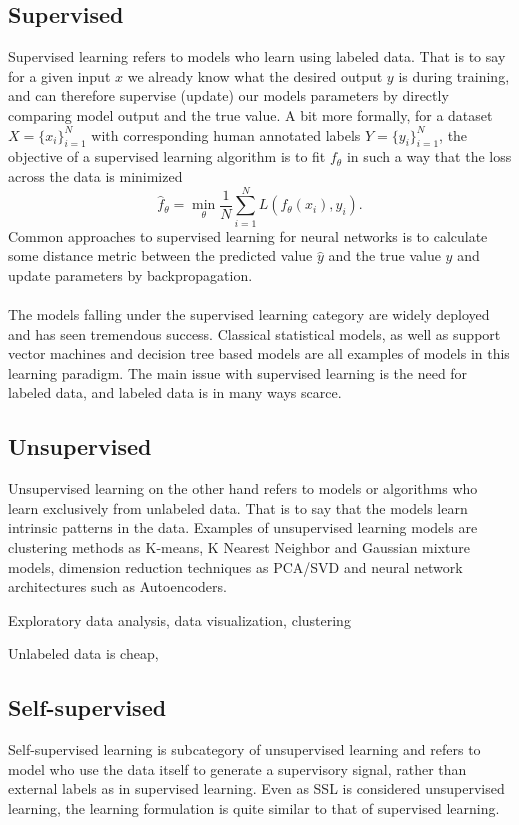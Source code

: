 \documentclass[../../thesis.tex]{subfiles}
\begin{document}
\subsection{Supervised}
Supervised learning refers to models who learn using labeled data. That is to say for a given input $x$ we already know what the desired output $y$ is during training, and can therefore supervise (update) our models parameters by directly comparing model output and the true value. A bit more formally, for a dataset $X = \{x_i\}_{i=1}^N$ with corresponding human annotated labels $Y = \{y_i\}_{i=1}^N$, the objective of a supervised learning algorithm is to fit $f_\theta$ in such a way that the loss across the data is minimized
\begin{equation}
    \widehat{f}_\theta = \min_\theta \frac{1}{N} \sum_{i=1}^N L(f_\theta(x_i),y_i).
\end{equation}
Common approaches to supervised learning for neural networks is to calculate some distance metric between the predicted value $\widehat{y}$ and the true value $y$ and update parameters by backpropagation.\\\\
The models falling under the supervised learning category are widely deployed and has seen tremendous success. Classical statistical models, as well as support vector machines and decision tree based models are all examples of models in this learning paradigm. The main issue with supervised learning is the need for labeled data, and labeled data is in many ways scarce.

\subsection{Unsupervised}
Unsupervised learning on the other hand refers to models or algorithms who learn exclusively from unlabeled data. That is to say that the models learn intrinsic patterns in the data. Examples of unsupervised learning models are clustering methods as K-means, K Nearest Neighbor and Gaussian mixture models, dimension reduction techniques as PCA/SVD and neural network architectures such as Autoencoders. 


Exploratory data analysis, data visualization, clustering

Unlabeled data is cheap, 

\subsection{Self-supervised}
Self-supervised learning is subcategory of unsupervised learning and refers to model who use the data itself to generate a supervisory signal, rather than external labels as in supervised learning. Even as SSL is considered unsupervised learning, the learning formulation is quite similar to that of supervised learning.\newline
\end{document}
